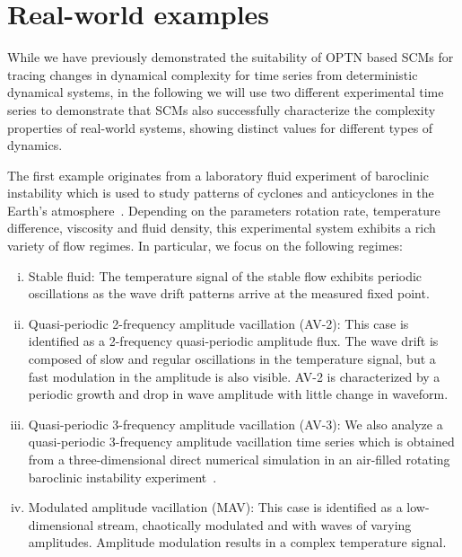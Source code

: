 \documentclass[12pt,aip,cha,reprint,nofootinbib]{revtex4-1}
\begin{document}
\section{Real-world examples} \label{sec:time}

While we have previously demonstrated the suitability of OPTN based SCMs for tracing changes in dynamical complexity for time series from deterministic dynamical systems, in the following we will use two different experimental time series to demonstrate that SCMs also successfully characterize the complexity properties of real-world systems, showing distinct values for different types of dynamics. 

The first example originates from a laboratory fluid experiment of baroclinic instability which is used to study patterns of cyclones and anticyclones in the Earth's atmosphere~\cite{Read_jfm_1992,ZouEPJST2008}. Depending on the parameters rotation rate, temperature difference, viscosity and fluid density, this experimental system exhibits a rich variety of flow regimes. In particular, we focus on the following regimes: 
\begin{enumerate}[(i)]
\item {Stable fluid:} The temperature signal of the stable flow exhibits periodic oscillations as the wave drift patterns arrive at the measured fixed point. 
\item {Quasi-periodic 2-frequency amplitude vacillation (AV-2):} This case is identified as a 2-frequency quasi-periodic amplitude flux. The wave drift is composed of slow and regular oscillations in the temperature signal, but a fast modulation in the amplitude is also visible. AV-2 is characterized by a periodic growth and drop in wave amplitude with little change in waveform. 
\item {Quasi-periodic 3-frequency amplitude vacillation (AV-3):} We also analyze a quasi-periodic 3-frequency amplitude vacillation time series which is obtained from a three-dimensional direct numerical simulation in an air-filled rotating baroclinic instability experiment~\cite{Read_jfm_1992}. 
\item {Modulated amplitude vacillation (MAV):} This case is identified as a low-dimensional stream, chaotically modulated and with waves of varying amplitudes. Amplitude modulation results in a complex temperature signal.
\end{enumerate}
\end{document}
